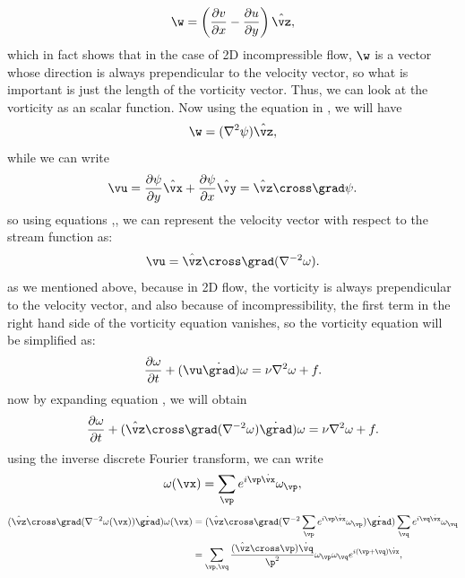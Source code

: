 \documentclass[12pt]{article}
\def\v{\bm}
\def\lap{{\nabla}^2}
\def\lapinv{{\nabla}^{-2}}
\def\vw{{\v\w}}
\begin{document}
\begin{equation}\label{Eq-4}
\vw=\left(\frac{\partial v}{\partial x}-\frac{\partial u}{\partial y}\right)\hat{\vz},
\end{equation}
which in fact shows that in the case of 2D incompressible flow, $\vw$ is a vector whose direction is always prependicular to the velocity vector, so what is important is just the length of the vorticity vector. Thus, we can look at the vorticity as an scalar function. Now using the equation  in , we will have
\begin{equation}\label{Eq-5}
\vw=(\lap\psi)\hat{\vz},
\end{equation}
while we can write
\begin{equation}\label{Eq-6}
\vu=\frac{\partial\psi}{\partial y}\hat{\vx}+\frac{\partial\psi}{\partial x}\hat{\vy}=\hat{\vz}\cross\grad\psi.
\end{equation}
so using equations ,, we can represent the velocity vector with respect to the stream function as:
\begin{equation}\label{Eq-7}
\vu=\hat{\vz}\cross\grad(\lapinv\omega).
\end{equation}
as we mentioned above, because in 2D flow, the vorticity is always prependicular to the velocity vector, and also because of incompressibility, the first term in the right hand side of the vorticity equation vanishes, so the vorticity equation will be simplified as:
\begin{equation}\label{Eq-8}
\frac{\partial \omega}{\partial t} + (\vu\dot\grad)\omega= \nu\lap\omega + f.
\end{equation}
now by expanding equation , we will obtain
\begin{equation}\label{Eq-9}
\frac{\partial \omega}{\partial t} + (\hat{\vz}\cross\grad(\lapinv\omega)\dot\grad)\omega= \nu\lap\omega + f.
\end{equation}
using the inverse discrete Fourier transform, we can write
\begin{equation*}
\omega(\vx)=\sum_{\vp}{e^{i\vp\dot\vx}\omega_{\vp}}, 
\end{equation*}
\begin{align*}
(\hat{\vz}\cross\grad(\lapinv\omega(\vx))\dot\grad)\omega(\vx) &=(\hat{\vz}\cross\grad(\lapinv\sum_{\vp}{e^{i\vp\dot\vx}\omega_{\vp}})\dot\grad)\sum_{\vq}{e^{i\vq\dot\vx}\omega_{\vq}} \\
&=\sum_{\vp,\vq}{\frac{(\hat{\vz}\cross\vp)\dot\vq}{\p^2}\omega_{\vp}\omega_{\vq}e^{i(\vp+\vq)\dot\vx}},
\end{align*}
\end{document}
